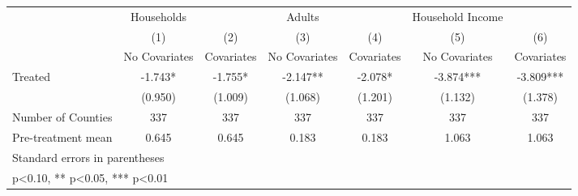 {
\def\sym#1{\ifmmode^{#1}\else\(^{#1}\)\fi}
\begin{tabular}{l*{6}{c}}
\hline\hline
            &  Households   &               &      Adults   &               &Household Income   &               \\
            &\multicolumn{1}{c}{(1)}&\multicolumn{1}{c}{(2)}&\multicolumn{1}{c}{(3)}&\multicolumn{1}{c}{(4)}&\multicolumn{1}{c}{(5)}&\multicolumn{1}{c}{(6)}\\
            &\multicolumn{1}{c}{No Covariates}&\multicolumn{1}{c}{Covariates}&\multicolumn{1}{c}{No Covariates}&\multicolumn{1}{c}{Covariates}&\multicolumn{1}{c}{No Covariates}&\multicolumn{1}{c}{Covariates}\\
\hline
Treated     &      -1.743*  &      -1.755*  &      -2.147** &      -2.078*  &      -3.874***&      -3.809***\\
            &     (0.950)   &     (1.009)   &     (1.068)   &     (1.201)   &     (1.132)   &     (1.378)   \\
\hline
Number of Counties&         337   &         337   &         337   &         337   &         337   &         337   \\
Pre-treatment mean&       0.645   &       0.645   &       0.183   &       0.183   &       1.063   &       1.063   \\
\hline\hline
\multicolumn{7}{l}{\footnotesize Standard errors in parentheses}\\
\multicolumn{7}{l}{\footnotesize * p<0.10, ** p<0.05, *** p<0.01}\\
\end{tabular}
}
